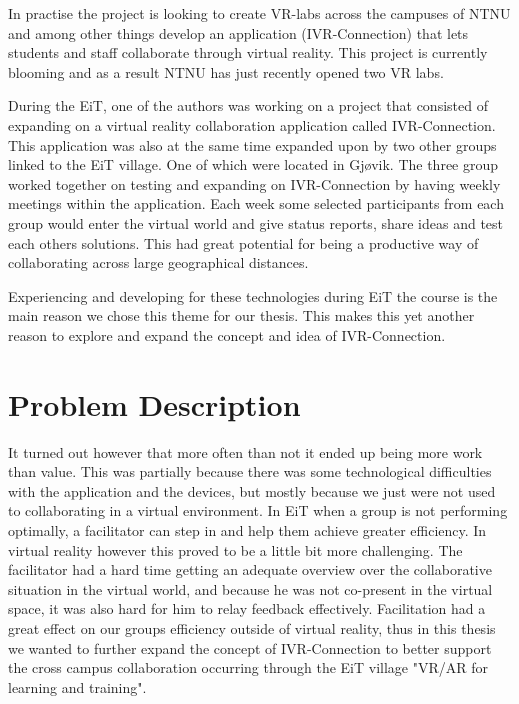         In practise the project is looking to create VR-labs across the campuses of NTNU and among other things develop an application (IVR-Connection) that lets students and staff collaborate through virtual reality. This project is currently blooming \cite{4C1R-Geminin} and as a result NTNU has just recently opened two VR labs. \cite{OpenVRLab} 
        
        During the EiT, one of the authors was working on a project that consisted of expanding on a virtual reality collaboration application called IVR-Connection. This application was also at the same time expanded upon by two other groups linked to the EiT village. One of which were located in Gjøvik. The three group worked together on testing and expanding on IVR-Connection by having weekly meetings within the application. Each week some selected participants from each group would enter the virtual world and give status reports, share ideas and test each others solutions. This had great potential for being a productive way of collaborating across large geographical distances.
        
        Experiencing and developing for these technologies during EiT the course is the main reason we chose this theme for our thesis. This makes this yet another reason to explore and expand the concept and idea of IVR-Connection.
    
    \section{Problem Description}
        It turned out however that more often than not it ended up being more work than value. This was partially because there was some technological difficulties with the application and the devices, but mostly because we just were not used to collaborating in a virtual environment. In EiT when a group is not performing optimally, a facilitator can step in and help them achieve greater efficiency. In virtual reality however this proved to be a little bit more challenging. The facilitator had a hard time getting an adequate overview over the collaborative situation in the virtual world, and because he was not co-present in the virtual space, it was also hard for him to relay feedback effectively. Facilitation had a great effect on our groups efficiency outside of virtual reality, thus in this thesis we wanted to further expand the concept of IVR-Connection to better support the cross campus collaboration occurring through the EiT village "VR/AR for learning and training".
        
